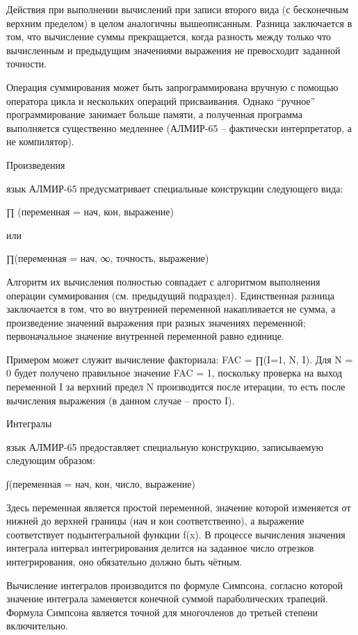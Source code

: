 \documentclass[11pt]{article}
\begin{document}
Действия при выполнении вычислений при
записи второго вида (с бесконечным
верхним пределом) в целом аналогичны
вышеописанным. Разница заключается в
том, что вычисление суммы прекращается,
когда разность между только что
вычисленным и предыдущим значениями
выражения не превосходит заданной
точности.

Операция суммирования может быть
запрограммирована вручную с помощью
оператора цикла и нескольких операций
присваивания. Однако “ручное”
программирование занимает больше
памяти, а полученная программа
выполняется существенно медленнее
(АЛМИР-65 – фактически интерпретатор, а
не компилятор).

Произведения

  язык АЛМИР-65 предусматривает
специальные конструкции следующего
вида:

∏ (переменная = нач, кон, выражение)

или

∏(переменная = нач, ∞, точность,
выражение)

Алгоритм их вычисления полностью
совпадает с алгоритмом выполнения
операции суммирования (см. предыдущий
подраздел). Единственная разница
заключается в том, что во внутренней
переменной накапливается не сумма, а
произведение значений выражения при
разных значениях переменной;
первоначальное значение внутренней
переменной равно единице.

Примером может служит вычисление
факториала: FAC = ∏(I=1, N, I). Для N = 0 будет
получено правильное значение FAC = 1,
поскольку проверка на выход переменной
I за верхний предел N производится после
итерации, то есть после вычисления
выражения (в данном случае – просто I).

Интегралы

  язык АЛМИР-65 предоставляет
специальную конструкцию, записываемую
следующим образом:

∫(переменная = нач, кон, число,
выражение)

Здесь переменная является простой
переменной, значение которой
изменяется от нижней до верхней
границы (нач и кон соответственно), а
выражение соответствует
подынтегральной функции f(x). В процессе
вычисления значения интеграла
интервал интегрирования делится на
заданное число отрезков
интегрирования, оно обязательно должно
быть чётным.

Вычисление интегралов производится по
формуле Симпсона, согласно которой
значение интеграла заменяется
конечной суммой параболических
трапеций. Формула Симпсона является
точной для многочленов до третьей
степени включительно.
\end{document}
